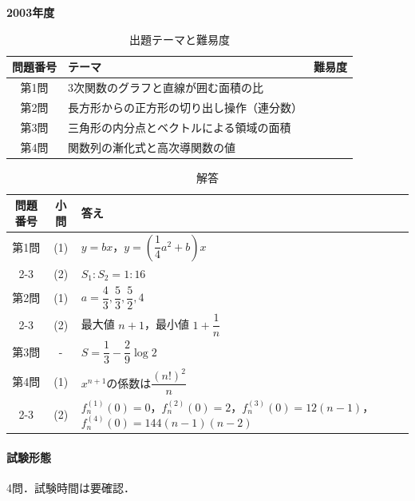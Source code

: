 \documentclass[../../main.tex]{subfiles}
\begin{document}
\begin{center}
  {\fontsize{48pt}{58pt}\selectfont \textbf{2003}\normalsize\textbf{年度}}
\end{center}

\begin{table}[htb]
  \centering
  \caption{出題テーマと難易度}
  \begin{tabular}{|c|p{9cm}|c|}
    \hline
    \textbf{問題番号} & \textbf{テーマ} & \textbf{難易度} \\
    \hline
    第1問 & 3次関数のグラフと直線が囲む面積の比 & \\
    \hline
    第2問 & 長方形からの正方形の切り出し操作（連分数） & \\
    \hline
    第3問 & 三角形の内分点とベクトルによる領域の面積 & \\
    \hline
    第4問 & 関数列の漸化式と高次導関数の値 & \\
    \hline
  \end{tabular}
\end{table}

\begin{table}[htb]
  \centering
  \caption{解答}
  \renewcommand{\arraystretch}{1.4}
  \begin{tabular}{|c|c|p{9cm}|}
    \hline
    \textbf{問題番号} & \textbf{小問} & \textbf{答え} \\
    \hline
    第1問 & (1) & $y=bx$，$y=\left(\dfrac{1}{4}a^2+b\right)x$ \\
    \cline{2-3}
    & (2) & $S_1:S_2=1:16$ \\
    \hline
    第2問 & (1) & $a=\dfrac{4}{3},\dfrac{5}{3},\dfrac{5}{2},4$ \\
    \cline{2-3}
    & (2) & 最大値 $n+1$，最小値 $1+\dfrac{1}{n}$ \\
    \hline
    第3問 & - & $S=\dfrac{1}{3}-\dfrac{2}{9}\log2$ \\
    \hline
    第4問 & (1) & $x^{n+1}$の係数は$\dfrac{(n!)^2}{n}$ \\
    \cline{2-3}
    & (2) & $f_n^{(1)}(0)=0$，$f_n^{(2)}(0)=2$，$f_n^{(3)}(0)=12(n-1)$，$f_n^{(4)}(0)=144(n-1)(n-2)$ \\
    \hline
  \end{tabular}
\end{table}

\paragraph{試験形態}
4問．試験時間は要確認．
\end{document}
